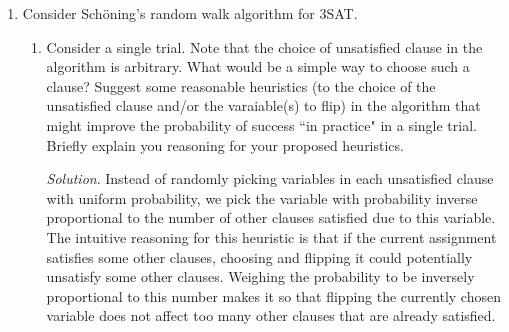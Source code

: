 \documentclass[11pt]{article}
\newcommand{\Exp}{\mathbb{E}}
\begin{document}
\begin{enumerate}[leftmargin=16pt]
\begin{proof}
        By construction of the algorithm, $|N_B(v)| - |N_A(v)| > 0$ implies $\Exp_{i}|A - \Exp_{i}|B > 0$ and
        $$
        \sum_{e \in E} (\Exp_{e,i} | A - \Exp_{e,i} | B) > 0 \implies \sum_{e \in E} \Exp_{e,i} | A > \sum_{e \in E} \Exp_{e,i} | B
        $$
        Assume that for $j < i$, it holds that
        \begin{equation} \label{eq:ind-hyp}
            \Exp[|E(A,B)| \mid X_1 = x_1, \ldots, X_{j-1} = x_{j-1}, X_j = x_j] \geq \Exp[|E(A,B)|]
        \end{equation}
        By inductive hypothesis (\ref{eq:ind-hyp}), either
        $$
        \Exp[|E(A,B)| \mid X_1 = x_1, \ldots, X_i = 1] \geq \Exp[|E(A,B)|]
        $$
        or
        $$
        \Exp[|E(A,B)| \mid X_1 = x_1, \ldots, X_i = 0] \geq \Exp[|E(A,B)|]
        $$
        so it follows that
        $$
        \max\{\Exp[|E(A,B)| \mid X_1 = x_1, \ldots, X_i = 0],\,\Exp[|E(A,B)| \mid X_1 = x_1, \ldots, X_i = 1]\} \geq \Exp[|E(A,B)|]
        $$
        Hence, by placing $v$ in $A$ when $\sum_{e \in E} \Exp_{e,i} | A > \sum_{e \in E} \Exp_{e,i} | B$ and vice versa, we ensures that
        \begin{equation} \label{eq:cut-size-increasing}
            \begin{aligned}
                \Exp[|E(A,B)| \mid X_1 = x_1, \ldots, X_{i-1} = x_{i-1}, X_i = x_i] &\geq \Exp[|E(A,B)| \mid X_1 = x_1, \ldots, X_{i-1} = x_{i-1}]  \\
                &\geq \Exp[|E(A,B)|]
            \end{aligned}
        \end{equation}
        Since $\Exp[|E(A,B)|] = |E| / 2$, the result follows from induction.
    \end{proof}

    \item Consider Sch\"oning's random walk algorithm for 3SAT.
    \begin{enumerate}
        \item Consider a single trial. Note that the choice of unsatisfied clause in the algorithm is arbitrary. What would be a simple way to choose such a clause? Suggest some reasonable heuristics (to the choice of the unsatisfied clause and/or the varaiable(s) to flip) in the algorithm that might improve the probability of success ``in practice" in a single trial. Briefly explain you reasoning for your proposed heuristics.  
        
        \textit{Solution}. Instead of randomly picking variables in each unsatisfied clause with uniform probability, we pick the variable with probability inverse proportional to the number of other clauses satisfied due to this variable. The intuitive reasoning for this heuristic is that if the current assignment satisfies some other clauses, choosing and flipping it could potentially unsatisfy some other clauses. Weighing the probability to be inversely proportional to this number makes it so that flipping the currently chosen variable does not affect too many other clauses that are already satisfied.


\end{enumerate}
\end{enumerate}
\end{document}
